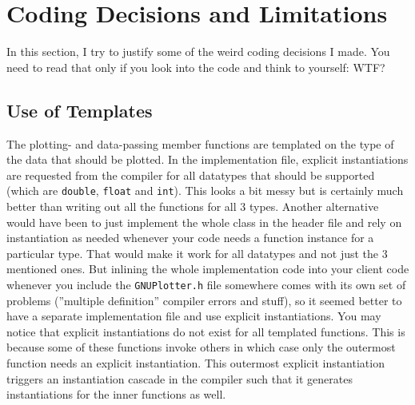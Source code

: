 \documentclass[11pt]{article}
\begin{document}


\section{Coding Decisions and Limitations}
In this section, I try to justify some of the weird coding decisions I made. You need to read that only if you look into the code and think to yourself: WTF?

\subsection{Use of Templates}
The plotting- and data-passing member functions are templated on the type of the data that should be plotted. In the implementation file, explicit instantiations are requested from the compiler for all datatypes that should be supported (which are \texttt{double}, \texttt{float} and \texttt{int}). This looks a bit messy but is certainly much better than writing out all the functions for all 3 types. Another alternative would have been to just implement the whole class in the header file and rely on instantiation as needed whenever your code needs a function instance for a particular type.  That would make it work for all datatypes and not just the 3 mentioned ones. But inlining the whole implementation code into your client code whenever you include the \texttt{GNUPlotter.h} file somewhere comes with its own set of problems (''multiple definition'' compiler errors and stuff), so it seemed better to have a separate implementation file and use explicit instantiations. You may notice that explicit instantiations do not exist for all templated functions. This is because some of these functions invoke others in which case only the outermost function needs an explicit instantiation. This outermost explicit instantiation triggers an instantiation cascade in the compiler such that it generates instantiations for the inner functions as well.
\end{document}
